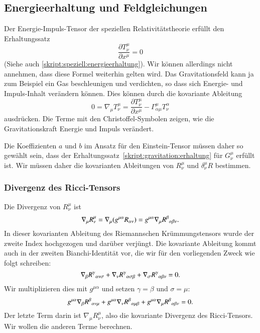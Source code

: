 \subsection{Energieerhaltung und Feldgleichungen}
Der Energie-Impuls-Tensor der speziellen Relativitätstheorie
erfüllt den Erhaltungssatz
\[
\frac{\partial T^\mu_\nu}{\partial x^\mu}
=0
\]
(Siehe auch \eqref{skript:speziell:energieerhaltung}).
Wir können allerdings nicht annehmen, dass diese Formel weiterhin
gelten wird.
Das Gravitationsfeld kann ja zum Beispiel ein Gas beschleunigen und 
verdichten, so dass sich Energie- und Impuls-Inhalt verändern können.
Dies können durch die kovariante Ableitung
\begin{equation}
0
=
\nabla_\mu T^\mu_\nu
=
\frac{\partial T^\mu_\nu}{\partial x^\mu}
-
\Gamma^{\mu}_{\alpha\mu}T^\alpha_\nu
\label{skript:gravitation:erhaltung}
\end{equation}
ausdrücken.
Die Terme mit den Christoffel-Symbolen zeigen, wie die Gravitationskraft
Energie und Impuls verändert.

Die Koeffizienten $a$ und $b$ im Ansatz
\label{skript:gravitation:einsteinansatz}
für den Einstein-Tensor müssen daher so gewählt sein, dass der 
Erhaltungssatz~\eqref{skript:gravitation:erhaltung} für $G^\mu_\nu$
erfüllt ist.
Wir müssen daher die kovarianten Ableitungen von $R^\mu_\nu$ und
$\delta^\mu_\nu R$ bestimmen.

\subsubsection{Divergenz des Ricci-Tensors}
Die Divergenz von $R^\mu_\nu$ ist
\[
\nabla_\mu R^\mu_\nu
=
\nabla_\mu (g^{\mu\alpha}R_{\alpha\nu})
=
g^{\mu\alpha} \nabla_\mu R^\beta\mathstrut_{\alpha\beta\nu}.
\]
In dieser kovarianten Ableitung des Riemannschen Krümmungstensors
wurde der zweite Index hochgezogen und darüber verjüngt.
Die kovariante Ableitung kommt auch in der zweiten Bianchi-Identität
vor, die wir für den vorliegenden Zweck wie folgt schreiben:
\[
\nabla_\beta R^\gamma\mathstrut_{\alpha\nu\sigma}
+
\nabla_\nu R^\gamma\mathstrut_{\alpha\sigma\beta}
+
\nabla_\sigma R^\gamma\mathstrut_{\alpha\beta\nu}
=
0.
\]
Wir multiplizieren dies mit $g^{\mu\alpha}$ und setzen $\gamma=\beta$
und $\sigma=\mu$:
\[
g^{\mu\alpha}
\nabla_\beta R^\beta\mathstrut_{\alpha\nu\mu}
+
g^{\mu\alpha}
\nabla_\nu R^\beta\mathstrut_{\alpha\mu\beta}
+
g^{\mu\alpha}
\nabla_\mu R^\beta\mathstrut_{\alpha\beta\nu}
=
0.
\]
Der letzte Term darin ist $\nabla_\mu R^\mu_\nu$, also die
kovariante Divergenz des Ricci-Tensors.
Wir wollen die anderen Terme berechnen.

